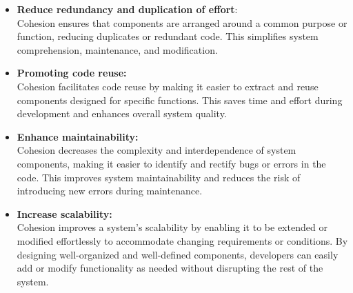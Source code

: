\begin{itemize}
    \item \textbf{Reduce redundancy and duplication of effort}: \\
    Cohesion ensures that components are arranged around a common purpose or function,
    reducing duplicates or redundant code. This simplifies system comprehension,
    maintenance, and modification.
    \item \textbf{Promoting code reuse:}\\
    Cohesion facilitates code reuse by making it easier to extract and reuse components
    designed for specific functions. This saves time and effort during development and
    enhances overall system quality.
    \item \textbf{Enhance maintainability:}\\
    Cohesion decreases the complexity and interdependence of system components, making it
    easier to identify and rectify bugs or errors in the code. This improves system
    maintainability and reduces the risk of introducing new errors during maintenance.
    \item \textbf{Increase scalability:}\\
    Cohesion improves a system's scalability by enabling it to be extended or modified
    effortlessly to accommodate changing requirements or conditions. By designing
    well-organized and well-defined components, developers can easily add or modify
    functionality as needed without disrupting the rest of the system.  
\end{itemize}